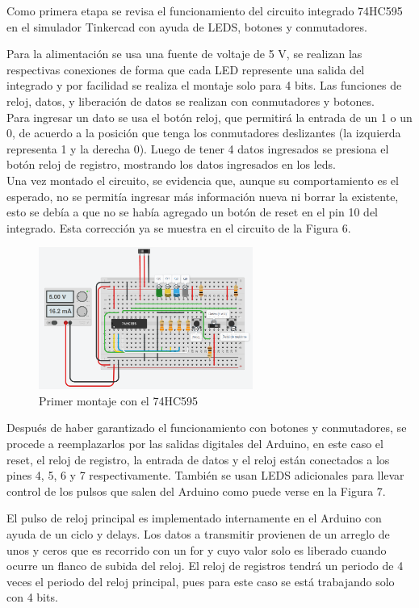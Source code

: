 \documentclass{article}
\begin{document}
Como primera etapa se revisa el funcionamiento del circuito integrado 74HC595 en el simulador Tinkercad con ayuda de LEDS, botones y conmutadores. 

Para la alimentación se usa una fuente de voltaje de 5 V, se realizan las respectivas conexiones de forma que cada LED represente una salida del integrado y por facilidad se realiza el montaje solo para 4 bits. Las funciones de reloj, datos, y liberación de datos se realizan con conmutadores y botones.\\

Para ingresar un dato se usa el botón reloj, que permitirá la entrada de un 1 o un 0, de acuerdo a la posición que tenga los conmutadores deslizantes (la izquierda representa 1 y la derecha 0). Luego de tener 4 datos ingresados se presiona el botón reloj de registro, mostrando los datos ingresados en los leds.\\

Una vez montado el circuito, se evidencia que, aunque su comportamiento es el esperado, no se permitía ingresar más información nueva ni borrar la existente, esto se debía a que no se había agregado un botón de reset en el pin 10 del integrado. Esta corrección ya se muestra en el circuito de la Figura 6.\\

\begin{figure}[ht]
\includegraphics[width=7cm]{montaje0.PNG}
\centering
\caption{Primer montaje con el 74HC595}
\end{figure}
\vspace{2cm}
Después de haber garantizado el funcionamiento con botones y conmutadores, se procede a reemplazarlos por las salidas digitales del Arduino, en este caso el reset, el reloj de registro, la entrada de datos y el reloj están conectados a los pines 4, 5, 6 y 7 respectivamente. También se usan LEDS adicionales para llevar control de los pulsos que salen del Arduino como puede verse en la Figura 7.

El pulso de reloj principal es implementado internamente en el Arduino con ayuda de un ciclo y delays. Los datos a transmitir provienen de un arreglo de unos y ceros que es recorrido con un for y cuyo valor solo es liberado  cuando ocurre un flanco de subida del reloj. El reloj de registros tendrá un periodo de 4 veces el periodo del reloj principal, pues para este caso se está trabajando solo con 4 bits.
\end{document}
